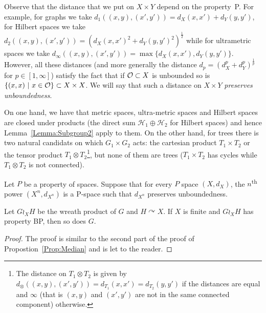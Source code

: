Observe that the distance that we put on $X\times Y$ depend on the property~P.
For example, for graphs we take $d_1((x,y),(x',y'))=d_X(x,x')+d_Y(y,y')$, for Hilbert spaces we take $d_2((x,y),(x',y'))=(d_X(x,x')^2+d_Y(y,y')^2)^{\frac12}$ while for ultrametric spaces we take $d_\infty((x,y),(x',y'))=\max\{d_X(x,x'),d_Y(y,y')\}$.
However, all these distances (and more generally the distance $d_p=(d_X^p+d_Y^p)^{\frac1p}$ for $p\in[1,\infty]$) satisfy the fact that if $\mathcal O \subset X$ is unbounded so %
is $\{(x,x)\ |\ x\in\orbite\}\subset X\times X$. We will say that such a distance on $X\times Y$ \emph{preserves unboundedness}.

On one hand, we have that metric spaces, ultra-metric spaces and Hilbert spaces are closed under products (the direct sum $\mathcal H_1\oplus\mathcal H_2$ for Hilbert spaces) and hence Lemma~\ref{Lemma:Subgroup2} apply to them.
On the other hand, for trees there is two natural candidats on which $G_1\times G_2$ acts: the cartesian product $T_1\times T_2$ or the tensor product $T_1\otimes T_2$\footnote{The distance on $T_1\otimes T_2$ is given by $d_\otimes((x,y),(x',y'))=d_{T_1}(x,x')=d_{T_2}(y,y')$ if the distances are equal and $\infty$ (that is $(x,y)$ and $(x',y')$ are not in the same connected component) otherwise. }, but none of them are trees ($T_1\times T_2$ has cycles while $T_1\otimes T_2$ is not connected).

\begin{lem}\label{Lemma:Product}
Let $P$ be a property of spaces.
Suppose that for every $P$ space $(X,d_X)$, the $n$\textsuperscript{th} power $(X^n,d_{X^n})$ is a P-space such that $d_{X^n}$ preserves unboundedness. 

Let $G\wr_X H$ be the wreath product of $G$ and $H\curvearrowright X$.
If $X$ is finite and $G\wr_X H$ has property BP, then so does $G$.
\end{lem}
\begin{proof}
The proof is similar to the second part of the proof of Propostion~\ref{Prop:Median} and is let to the reader.
\end{proof}





